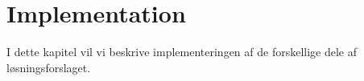 \chapter{Implementation}\label{Implementation}
I dette kapitel vil vi beskrive implementeringen af de forskellige dele af løsningsforslaget. 









